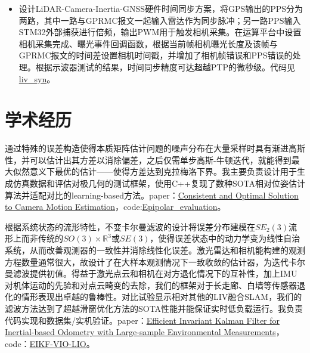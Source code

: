 \documentclass{resume}
\begin{document}
\begin{itemize}[parsep=0.5ex]
  \item 设计LiDAR-Camera-Inertia-GNSS硬件时间同步方案，将GPS输出的PPS分为两路，其中一路与GPRMC报文一起输入雷达作为同步脉冲；另一路PPS输入STM32外部捕获进行倍频，输出PWM用于触发相机采集。在运算平台中设置相机采集完成、曝光事件回调函数，根据当前帧相机曝光长度及该帧与GPRMC报文的时间差设置相机时间戳，并增加了相机帧错误和PPS错误的处理。根据示波器测试的结果，时间同步精度可达超越PTP的微秒级。代码见\textcolor{blue}{\href{https://github.com/LIAS-CUHKSZ/liv_syn}{liv\_syn}}。
\end{itemize}

\section{学术经历}

通过特殊的误差构造使得本质矩阵估计问题的噪声分布在大量采样时具有渐进高斯性，并可以估计出其方差以消除偏差，之后仅需单步高斯-牛顿迭代，就能得到最大似然意义下最优的估计——使得方差达到克拉梅洛下界。我主要负责设计用于生成仿真数据和评估对极几何的测试框架，使用C++复现了数种SOTA相对位姿估计算法并适配对比的learning-based方法。paper：\textcolor{blue}{\href{https://ieeexplore.ieee.org/document/11132316}{Consistent and Optimal Solution to Camera Motion Estimation}}，code:\textcolor{blue}{\href{https://github.com/LIAS-CUHKSZ/Epipolar_evaluation}{Epipolar\_evaluation}}。

根据系统状态的流形特性，不变卡尔曼滤波的设计将误差分布建模在$SE_2(3)$流形上而非传统的$SO(3)\times \mathbb{R}^3$或$SE(3)$，使得误差状态中的动力学变为线性自治系统，从而改善观测器的一致性并消除线性化误差。激光雷达和相机能构建的观测方程数量通常很大，故设计了在大样本观测情况下一致收敛的估计器，为迭代卡尔曼滤波提供初值。得益于激光点云和相机在对方退化情况下的互补性，加上IMU对机体运动的先验和对点云畸变的去除，我们的框架对于长走廊、白墙等传感器退化的情形表现出卓越的鲁棒性。对比试验显示相对其他的LIV融合SLAM，我们的滤波方法达到了超越滑窗优化方法的SOTA性能并能保证实时低负载运行。我负责代码实现和数据集/实机验证。paper：\textcolor{blue}{\href{https://arxiv.org/pdf/2402.05003.pdf}{Efficient Invariant Kalman Filter for Inertial-based Odometry with Large-sample Environmental Measurements}}，code：\textcolor{blue}{\href{https://github.com/LIAS-CUHKSZ/EIKF-VIO-LIO}{EIKF-VIO-LIO}}。
\end{document}
